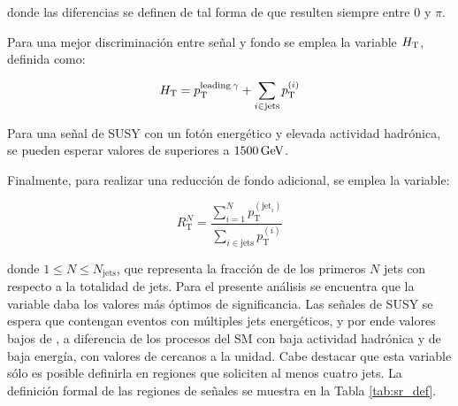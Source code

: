 \noindent
donde las diferencias se definen de tal forma de que resulten siempre entre $0$ y $\pi$.

Para una mejor discriminación entre señal y fondo se emplea la variable $H_{\text{T}}$, definida como:

\begin{equation}
  H_{\text{T}} = p_{\text{T}}^{\text{leading}\: \gamma} + \sum_{i \in \text{jets}} p_{\text{T}}^{(i)}
\end{equation}

Para una señal de SUSY con un fotón energético y elevada actividad hadrónica, se pueden esperar valores de \HT superiores a $1500\,\text{GeV}$.

Finalmente, para realizar una reducción de fondo adicional, se emplea la variable:

\begin{equation}
  R_{\text{T}}^{N} = \frac{\sum_{i=1}^{N} p_{\text{T}}^{(\text{jet}_i)}}{\sum_{i \in \text{jets}} p_{\text{T}}^{(i)}}
\end{equation}

\noindent
donde $1\le N \le N_{\text{jets}}$, que representa la fracción de \pt de los primeros $N$ jets con respecto a la totalidad de jets. Para el presente análisis se encuentra que la variable \rtf daba los valores más óptimos de significancia. Las señales de SUSY se espera que contengan eventos con múltiples jets energéticos, y por ende valores bajos de \rtf, a diferencia de los procesos del SM con baja actividad hadrónica y de baja energía, con valores de \rtf cercanos a la unidad. Cabe destacar que esta variable sólo es posible definirla en regiones que soliciten al menos cuatro jets.
La definición formal de las regiones de señales se muestra en la Tabla \ref{tab:sr_def}.

